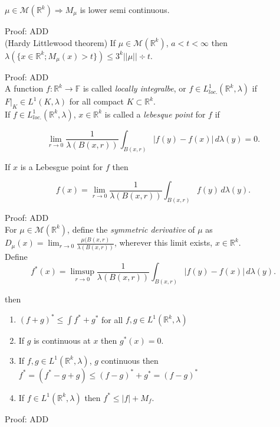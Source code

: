 \documentclass[12pt]{article}
\newcommand{\rimply}[0] { \Rightarrow }
\newcommand{\rarw}[0] { \rightarrow }
\newcommand{\reals}[0] { \mathbb{R}}
\newcommand{\M}[0] { \mathcal{M} }
\begin{document}
$\mu \in \M(\reals^k) \rimply M_\mu$ is lower semi continuous.

\noindent
Proof: ADD \\

(Hardy Littlewood theorem) If $\mu \in \M(\reals^k)$, $a < t < \infty$ then $\lambda(\{ x \in \reals^k; M_\mu(x) > t \} ) \le 3^k ||\mu|| \div t$.

\noindent
Proof: ADD \\

A function $f : \reals^k \rarw \mathbb{F}$ is called \emph{locally integralbe}, or $f \in L^1_{loc.}(\reals^k, \lambda)$ if $F|_K \in L^1(K, \lambda)$ for all compact $K \subset \reals^k$.  \\

If $f \in L^1_{loc.}(\reals^k, \lambda)$, $x \in \reals^k$ is called a \emph{lebesque point} for $f$ if

$$
\lim_{r \rarw 0} \frac{1}{ \lambda(B(x,r))} \int_{B(x,r)} |f(y)-f(x)| \, d \lambda(y) = 0.
$$

\noindent
If $x$ is a Lebesgue point for $f$ then

$$
f(x) = \lim_{r \rarw 0} \frac{1}{ \lambda(B(x,r))} \int_{B(x,r)} f(y) \, d \lambda(y).
$$


\noindent
Proof: ADD \\




For $\mu \in \M(\reals^k)$, define the \emph{symmetric derivative} of $\mu$ as $D_\mu(x) = \lim_{r \rarw 0} \frac{\mu(B(x,r)}{\lambda(B(x,r))}$, wherever this limit exists, $x \in \reals^k$. \\



Define 
$$
    f^*(x) = \limsup_{r \rarw 0} \frac{1}{ \lambda(B(x,r))} \int_{B(x,r)} |f(y)-f(x)| \, d \lambda(y) .
$$

\noindent
then
\begin{enumerate}[1)]
\item
$(f+g)^* \le \int f^* + g^*$ for all $f,g \in L^1(\reals^k, \lambda)$
\item 
If $g$ is continuous at $x$ then $g^*(x) = 0$.
\item
If $f,g \in L^1(\reals^k, \lambda)$, $g$ continuous then $f^* = (f^* - g + g) \le (f-g)^* + g^* = (f-g)^*$
\item
If $f \in L^1(\reals^k, \lambda)$ then $f^* \le |f| + M_f$.
\end{enumerate} 


\noindent
Proof: ADD \\
\end{document}
